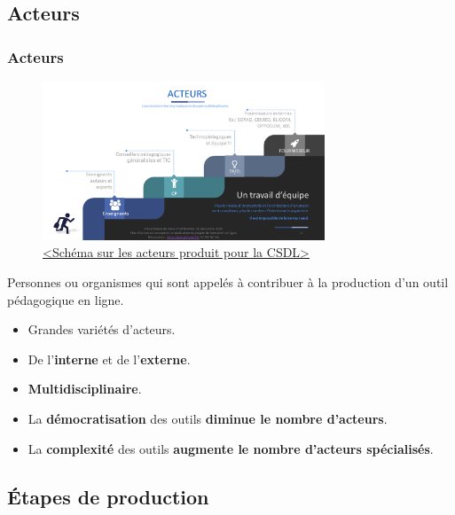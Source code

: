 		 \subsection{Acteurs} 
					\begin{frame}[allowframebreaks]
						\frametitle{Acteurs}
                        			\begin{figure}
                     			\centering
                    			 \includegraphics[width = 0.75\textwidth]{acteurs.png}
                     			\caption{\tiny{\href{run:acteurs.png}{<Schéma sur les acteurs produit pour la CSDL>}}}
                   			\end{figure}
                        			Personnes ou organismes qui sont appelés à contribuer à la production d’un outil pédagogique en ligne.
							\begin{itemize}
							\item Grandes variétés d'acteurs.
							\item De l'\textbf{interne} et de l'\textbf{externe}.
							\item \textbf{Multidisciplinaire}.								
							\item La \textbf{démocratisation} des outils \textbf{diminue le nombre d'acteurs}.
							\item La \textbf{complexité} des outils \textbf{augmente le nombre d'acteurs spécialisés}.
							\end{itemize}
						
					\end{frame}
					
					
					
					 \subsection{Étapes de production}
					  
